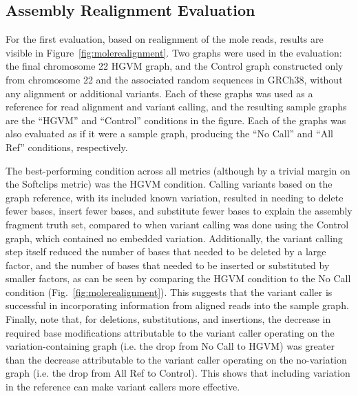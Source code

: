 \subsection{Assembly Realignment Evaluation}
\label{subsec:assemblyrealignmenteval}

For the first evaluation, based on realignment of the mole reads, results are visible in Figure~\ref{fig:molerealignment}. Two graphs were used in the evaluation: the final chromosome 22 HGVM graph, and the Control graph constructed only from chromosome 22 and the associated random sequences in GRCh38, without any alignment or additional variants. Each of these graphs was used as a reference for read alignment and variant calling, and the resulting sample graphs are the ``HGVM'' and ``Control'' conditions in the figure. Each of the graphs was also evaluated as if it were a sample graph, producing the ``No Call'' and ``All Ref'' conditions, respectively.

The best-performing condition across all metrics (although by a trivial margin on the Softclips metric) was the HGVM condition. Calling variants based on the graph reference, with its included known variation, resulted in needing to delete fewer bases, insert fewer bases, and substitute fewer bases to explain the assembly fragment truth set, compared to when variant calling was done using the Control graph, which contained no embedded variation. Additionally, the variant calling step itself reduced the number of bases that needed to be deleted by a large factor, and the number of bases that needed to be inserted or substituted by smaller factors, as can be seen by comparing the HGVM condition to the No Call condition (Fig.~\ref{fig:molerealignment}). This suggests that the variant caller is successful in incorporating information from aligned reads into the sample graph. Finally, note that, for deletions, substitutions, and insertions, the decrease in required base modifications attributable to the variant caller operating on the variation-containing graph (i.e. the drop from No Call to HGVM) was greater than the decrease attributable to the variant caller operating on the no-variation graph (i.e. the drop from All Ref to Control). This shows that including variation in the reference can make variant callers more effective.

